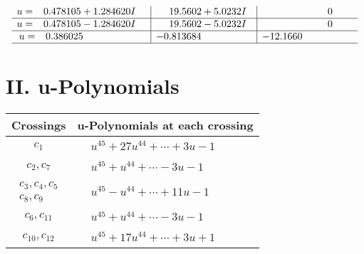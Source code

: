 \documentclass[1p]{elsarticle_modified}
\theoremstyle{definition}
\begin{document}
$$\begin{array}{c|c|c}
\begin{aligned}
u &= \phantom{-}0.478105 + 1.284620 I\end{aligned}
 & \phantom{-}19.5602 + 5.0232 I & \phantom{-0.000000 } 0 \\ \hline\begin{aligned}
u &= \phantom{-}0.478105 - 1.284620 I\end{aligned}
 & \phantom{-}19.5602 - 5.0232 I & \phantom{-0.000000 } 0 \\ \hline\begin{aligned}
u &= \phantom{-}0.386025\phantom{ +0.000000I}\end{aligned}
 & -0.813684\phantom{ +0.000000I} & -12.1660\phantom{ +0.000000I}\\
 \hline 
 \end{array}$$\newpage
\newpage\renewcommand{\arraystretch}{1}
\centering \section*{ II. u-Polynomials}
\begin{tabular}{m{50pt}|m{274pt}}
Crossings & \hspace{64pt}u-Polynomials at each crossing \\
\hline $$\begin{aligned}c_{1}\end{aligned}$$&$\begin{aligned}
&u^{45}+27 u^{44}+\cdots+3 u-1
\end{aligned}$\\
\hline $$\begin{aligned}c_{2},c_{7}\end{aligned}$$&$\begin{aligned}
&u^{45}+u^{44}+\cdots-3 u-1
\end{aligned}$\\
\hline $$\begin{aligned}c_{3},c_{4},c_{5}\\c_{8},c_{9}\end{aligned}$$&$\begin{aligned}
&u^{45}- u^{44}+\cdots+11 u-1
\end{aligned}$\\
\hline $$\begin{aligned}c_{6},c_{11}\end{aligned}$$&$\begin{aligned}
&u^{45}+u^{44}+\cdots-3 u-1
\end{aligned}$\\
\hline $$\begin{aligned}c_{10},c_{12}\end{aligned}$$&$\begin{aligned}
&u^{45}+17 u^{44}+\cdots+3 u+1
\end{aligned}$\\
\hline
\end{tabular}\newpage\renewcommand{\arraystretch}{1}
\end{document}
